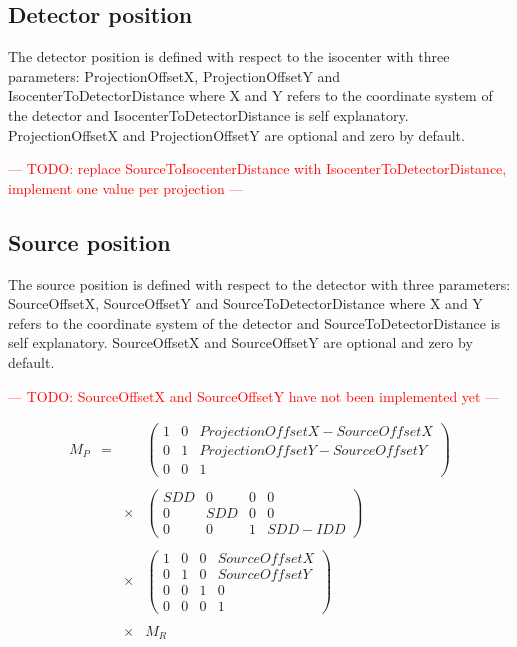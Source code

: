 \documentclass{article}
\newcommand{\question}[1]{\textcolor{red}{--- #1 ---}}
\begin{document}
\subsection{Detector position}

The detector position is defined with respect to the isocenter with three parameters: ProjectionOffsetX, ProjectionOffsetY and IsocenterToDetectorDistance where X and Y refers to the coordinate system of the detector and IsocenterToDetectorDistance is self explanatory. ProjectionOffsetX and ProjectionOffsetY are optional and zero by default.

\question{TODO: replace SourceToIsocenterDistance with IsocenterToDetectorDistance, implement one value per projection}

\subsection{Source position}

The source position is defined with respect to the detector with three parameters: SourceOffsetX, SourceOffsetY and SourceToDetectorDistance where X and Y refers to the coordinate system of the detector and SourceToDetectorDistance is self explanatory. SourceOffsetX and SourceOffsetY are optional and zero by default.

\question{TODO: SourceOffsetX and SourceOffsetY have not been implemented yet}

%
$$
\begin{array}{lcll}
  M_P & = & & %
  \begin{pmatrix}
    1 & 0 & ProjectionOffsetX-SourceOffsetX  \\
    0 & 1 & ProjectionOffsetY-SourceOffsetY  \\
    0 & 0 & 1
  \end{pmatrix} %
  \\ \\ & & \times & %
  \begin{pmatrix}
    SDD & 0 & 0 & 0  \\
    0 & SDD & 0 & 0  \\
    0 & 0 & 1 & SDD-IDD
  \end{pmatrix} %
  \\ \\ & & \times & %
  \begin{pmatrix}
    1 & 0 & 0 & SourceOffsetX  \\
    0 & 1 & 0 & SourceOffsetY  \\
    0 & 0 & 1 & 0 \\
    0 & 0 & 0 & 1
  \end{pmatrix} %
  \\ \\ & & \times & %
  M_R
\end{array}
$$
\end{document}
